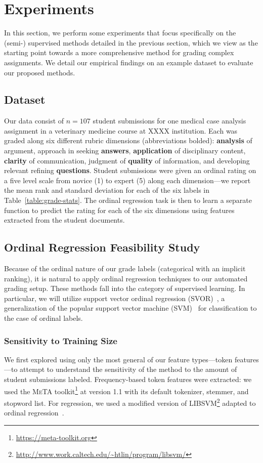 \section{Experiments}

In this section, we perform some experiments that focus specifically on the
(semi-) supervised methods detailed in the previous section, which we view
as the starting point towards a more comprehensive method for grading
complex assignments. We detail our empirical findings on an example
dataset to evaluate our proposed methods.

\subsection{Dataset}

Our data consist of $n = 107$ student submissions for one medical case
analysis assignment in a veterinary medicine course at XXXX institution.
Each was graded along six different rubric dimensions (abbreviations
bolded): \textbf{analysis} of argument, approach in seeking
\textbf{answers}, \textbf{application} of disciplinary content,
\textbf{clarity} of communication, judgment of \textbf{quality} of
information, and developing relevant refining \textbf{questions}. Student
submissions were given an ordinal rating on a five level scale from novice
(1) to expert (5) along each dimension---we report the mean rank and
standard deviation for each of the six labels in
Table~\ref{table:grade-stats}. The ordinal regression task is then to
learn a separate function to predict the rating for each of the six
dimensions using features extracted from the student documents.



\subsection{Ordinal Regression Feasibility Study}

Because of the ordinal nature of our grade labels (categorical with an
implicit ranking), it is natural to apply ordinal regression techniques to
our automated grading setup. These methods fall into the category of
supervised learning. In particular, we will utilize support vector
ordinal regression (SVOR)~\cite{Chu:2007:SVOR}, a generalization of the
popular support vector machine (SVM)~\cite{Cortes:1995:SVM} for
classification to the case of ordinal labels.

\subsubsection{Sensitivity to Training Size}
We first explored using only the most general of our feature types---token
features---to attempt to understand the sensitivity of the method to the
amount of student submissions labeled. Frequency-based token features were
extracted: we used the \textsc{MeTA}
toolkit\footnote{\url{https://meta-toolkit.org}} at version 1.1
with its default tokenizer, stemmer, and stopword list. For regression, we
used a modified version of
\textsc{LIBSVM}\footnote{\url{http://www.work.caltech.edu/~htlin/program/libsvm/}}
adapted to ordinal regression~\cite{Li:2007:NIPS}.

